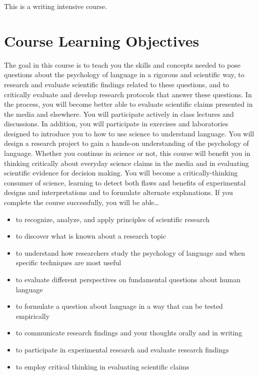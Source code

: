 \documentclass[
  letterpaper,
  DIV=11,
  numbers=noendperiod]{scrreprt}
\providecommand{\tightlist}{%
  \setlength{\itemsep}{0pt}\setlength{\parskip}{0pt}}\usepackage{longtable,booktabs,array}
\begin{document}
This is a writing intensive course.

\hypertarget{course-learning-objectives}{%
\section*{Course Learning Objectives}\label{course-learning-objectives}}


The goal in this course is to teach you the skills and concepts needed
to pose questions about the psychology of language in a rigorous and
scientific way, to research and evaluate scientific findings related to
these questions, and to critically evaluate and develop research
protocols that answer these questions. In the process, you will become
better able to evaluate scientific claims presented in the media and
elsewhere. You will participate actively in class lectures and
discussions. In addition, you will participate in exercises and
laboratories designed to introduce you to how to use science to
understand language. You will design a research project to gain a
hands-on understanding of the psychology of language. Whether you
continue in science or not, this course will benefit you in thinking
critically about everyday science claims in the media and in evaluating
scientific evidence for decision making. You will become a
critically-thinking consumer of science, learning to detect both flaws
and benefits of experimental designs and interpretations and to
formulate alternate explanations. If you complete the course
successfully, you will be able\ldots{}

\begin{itemize}
\tightlist
\item
  to recognize, analyze, and apply principles of scientific research
\item
  to discover what is known about a research topic
\item
  to understand how researchers study the psychology of language and
  when specific techniques are most useful
\item
  to evaluate different perspectives on fundamental questions about
  human language
\item
  to formulate a question about language in a way that can be tested
  empirically
\item
  to communicate research findings and your thoughts orally and in
  writing
\item
  to participate in experimental research and evaluate research findings
\item
  to employ critical thinking in evaluating scientific claims
\end{itemize}
\end{document}
